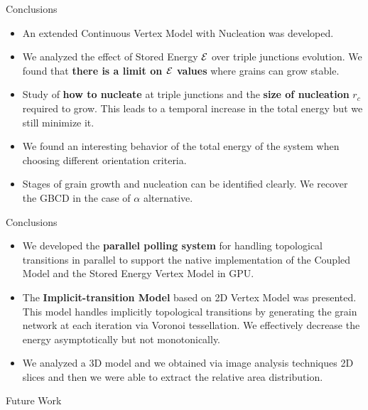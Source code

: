 \documentclass[usenames,dvipsnames]{beamer}
\begin{document}
\begin{frame}{Conclusions}
    \begin{itemize}
        \item An extended Continuous Vertex Model with Nucleation was developed.
        \item We analyzed the effect of Stored Energy $\mathcal{E}$ over triple junctions evolution. We found that \textbf{there is a limit on $\mathcal{E}$ values} where grains can grow stable.
        \item Study of \textbf{how to nucleate} at triple junctions and the \textbf{size of nucleation} $r_c$ required to grow. This leads to a temporal increase in the total energy but we still minimize it.
        \item We found an interesting behavior of the total energy of the system when choosing different orientation criteria.
        \item Stages of grain growth and nucleation can be identified clearly. We recover the GBCD in the case of $\alpha$ alternative.
    \end{itemize}
\end{frame}

\begin{frame}{Conclusions}
    \begin{itemize}
        \item We developed the \textbf{parallel polling system} for handling topological transitions in parallel to support the native implementation of the Coupled Model and the Stored Energy Vertex Model in GPU.
        \item The \textbf{Implicit-transition Model} based on 2D Vertex Model was presented. This model handles implicitly topological transitions by generating the grain network at each iteration via Voronoi tessellation. We effectively decrease the energy asymptotically but not monotonically.
        \item We analyzed a 3D model and we obtained via image analysis techniques 2D slices and then we were able to extract the relative area distribution.
    \end{itemize}
\end{frame}

\begin{frame}{Future Work}
    
\end{frame}

\begin{frame}
     \centering
\end{frame}
\end{document}
